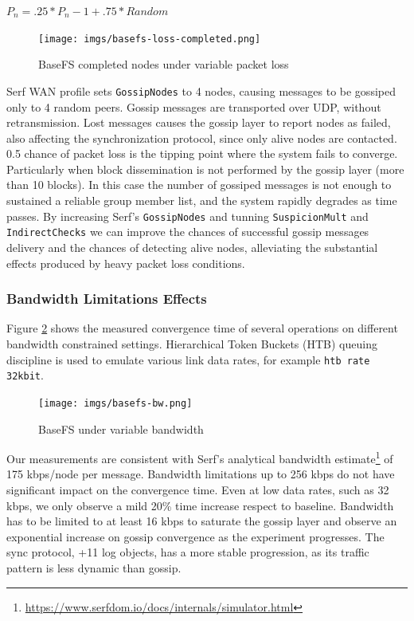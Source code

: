 \documentclass{sig-alternate}
\begin{document}
$P_n = .25 * P_n-1 + .75 * Random$



\begin{figure}
\centering
\texttt{[image: imgs/basefs-loss-completed.png]}
\caption{BaseFS completed nodes under variable packet loss}
\label{fig:basefs-loss-completed}
\end{figure}


Serf WAN profile sets \texttt{GossipNodes} to 4 nodes, causing messages to be gossiped only to 4 random peers. Gossip messages are transported over UDP, without retransmission. Lost messages causes the gossip layer to report nodes as failed, also affecting the synchronization protocol, since only alive nodes are contacted. 0.5 chance of packet loss is the tipping point where the system fails to converge. Particularly when block dissemination is not performed by the gossip layer (more than 10 blocks). In this case the number of gossiped messages is not enough to sustained a reliable group member list, and the system rapidly degrades as time passes. By increasing Serf's \texttt{GossipNodes} and tunning \texttt{SuspicionMult} and \texttt{IndirectChecks} we can improve the chances of successful gossip messages delivery and the chances of detecting alive nodes, alleviating the substantial effects produced by heavy packet loss conditions.


\subsubsection{Bandwidth Limitations Effects}

Figure \ref{fig:basefs-bw} shows the measured convergence time of several operations on different bandwidth constrained settings. Hierarchical Token Buckets (HTB) queuing discipline is used to emulate various link data rates, for example \texttt{htb rate 32kbit}.

\begin{figure}
\centering
\texttt{[image: imgs/basefs-bw.png]}
\caption{BaseFS under variable bandwidth}
\label{fig:basefs-bw}
\end{figure}

Our measurements are consistent with Serf's analytical bandwidth estimate\footnote{\url{https://www.serfdom.io/docs/internals/simulator.html}} of 175 kbps/node per message. Bandwidth limitations up to 256 kbps do not have significant impact on the convergence time. Even at low data rates, such as 32 kbps, we only observe a mild 20\% time increase respect to baseline. Bandwidth has to be limited to at least 16 kbps to saturate the gossip layer and observe an exponential increase on gossip convergence as the experiment progresses. The sync protocol, +11 log objects, has a more stable progression, as its traffic pattern is less dynamic than gossip.
\end{document}

